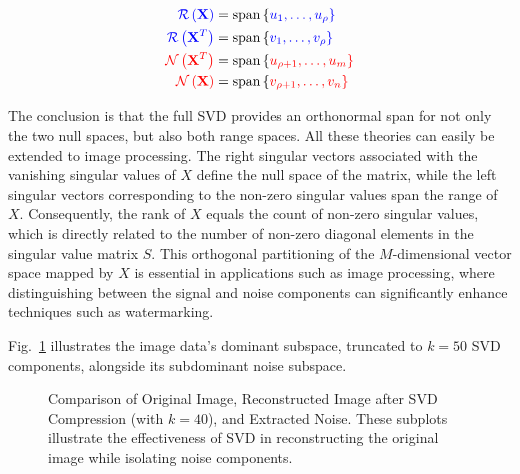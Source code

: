 \documentclass[
  journal,
]{IEEEtran}%
\begin{document}
\begin{align*} 
\color{blue}{\mathcal{R} \left( \mathbf{X} \right)} &=
\text{span} \left\{
 \color{blue}{u_{1}}, \dots , \color{blue}{u_{\rho}}
\right\} \\
\color{blue}{\mathcal{R} \left( \mathbf{X}^{T} \right)} &=
\text{span} \left\{
 \color{blue}{v_{1}}, \dots , \color{blue}{v_{\rho}}
\right\} \\
\color{red}{\mathcal{N} \left( \mathbf{X}^{T} \right)} &=
\text{span} \left\{
\color{red}{u_{\rho+1}}, \dots , \color{red}{u_{m}}
\right\} \\
\color{red}{\mathcal{N} \left( \mathbf{X} \right)} &=
\text{span} \left\{
\color{red}{v_{\rho+1}}, \dots , \color{red}{v_{n}}
\right\} \\
%
\end{align*}

The conclusion is that the full SVD provides an orthonormal span for not
only the two null spaces, but also both range spaces. All these theories
can easily be extended to image processing. The right singular vectors
associated with the vanishing singular values of \(X\) define the null
space of the matrix, while the left singular vectors corresponding to
the non-zero singular values span the range of \(X\). Consequently, the
rank of \(X\) equals the count of non-zero singular values, which is
directly related to the number of non-zero diagonal elements in the
singular value matrix \(S\). This orthogonal partitioning of the
\(M\)-dimensional vector space mapped by \(X\) is essential in
applications such as image processing, where distinguishing between the
signal and noise components can significantly enhance techniques such as
watermarking.

Fig.~\ref{fig-svd-comparison} illustrates the image data's dominant
subspace, truncated to \(k = 50\) SVD components, alongside its
subdominant noise subspace.

\begin{figure}


\caption{\label{fig-svd-comparison}Comparison of Original Image,
Reconstructed Image after SVD Compression (with \(k=40\)), and Extracted
Noise. These subplots illustrate the effectiveness of SVD in
reconstructing the original image while isolating noise components.}

\end{figure}%
\end{document}
